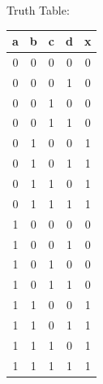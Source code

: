 \documentclass{article}
\begin{document}
 {
     Truth Table: \\
     \begin{tabular}{|c | c | c | c | c|}
          \hline
          a & b & c & d & x \\
          \hline
          0 & 0 & 0 & 0 & 0 \\
          \hline
          0 & 0 & 0 & 1 & 0 \\
          \hline
          0 & 0 & 1 & 0 & 0 \\
          \hline
          0 & 0 & 1 & 1 & 0 \\
          \hline
          0 & 1 & 0 & 0 & 1 \\
          \hline
          0 & 1 & 0 & 1 & 1 \\
          \hline
          0 & 1 & 1 & 0 & 1 \\
          \hline
          0 & 1 & 1 & 1 & 1 \\
          \hline
          1 & 0 & 0 & 0 & 0 \\
          \hline
          1 & 0 & 0 & 1 & 0 \\
          \hline
          1 & 0 & 1 & 0 & 0 \\
          \hline
          1 & 0 & 1 & 1 & 0 \\
          \hline
          1 & 1 & 0 & 0 & 1 \\
          \hline
          1 & 1 & 0 & 1 & 1 \\
          \hline
          1 & 1 & 1 & 0 & 1 \\
          \hline
          1 & 1 & 1 & 1 & 1 \\
          \hline
     \end{tabular}
}
\end{document}
